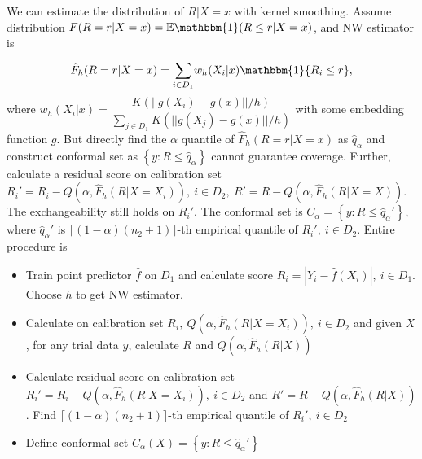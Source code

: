 \documentclass[12pt, a4paper, oneside]{article}
\begin{document}
    
    We can estimate the distribution of $R|X=x$ with kernel smoothing. Assume distribution $F(R=r|X=x)=\mathbb{E}\mathbbm{1}(R\leq r|X=x)$, and NW estimator is
    \begin{equation*}
        \hat{F}_h(R=r|X=x)=\overset{}{\underset{i\in D_1}\sum}w_h(X_i|x)\mathbbm{1}\{R_i\leq r\},
    \end{equation*}
    where $w_h(X_i|x)=\dfrac{K(||g(X_i)-g(x)||/h)}{\overset{}{\underset{j\in D_1}\sum}K(||g(X_j)-g(x)||/h)}$ with some embedding function $g$. But directly find the $\alpha$ quantile of $\hat{F}_h(R=r|X=x)$ as $\hat{q}_\alpha$ and construct conformal set as $\left\{ y:R\leq \hat{q}_\alpha \right\}$ cannot guarantee coverage. Further, calculate a residual score on calibration set $R_i'=R_i-Q(\alpha,\hat{F}_h(R|X=X_i)),\ i\in D_2,\ R'=R-Q(\alpha,\hat{F}_h(R|X=X))$. The exchangeability still holds on $R_i'$. The conformal set is $C_\alpha=\left\{ y:R\leq\hat{q}_\alpha' \right\}$, where $\hat{q}_\alpha'$ is $\lceil(1-\alpha)(n_2+1)\rceil$-th empirical quantile of $R_i',\ i\in D_2$. Entire procedure is
    \begin{itemize}
        \item Train point predictor $\hat{f}$ on $D_1$ and calculate score $R_i=|Y_i-\hat{f}(X_i)|,\ i\in D_1$. Choose $h$ to get NW estimator.
        \item Calculate on calibration set $R_i,\ Q(\alpha,\hat{F}_h(R|X=X_i)),\ i\in D_2$ and given $X$, for any trial data $y$, calculate $R$ and $Q(\alpha,\hat{F}_h(R|X))$
        \item Calculate residual score on calibration set $R_i'=R_i-Q(\alpha,\hat{F}_h(R|X=X_i)),\ i\in D_2$ and $R'=R-Q(\alpha,\hat{F}_h(R|X))$. Find $\lceil(1-\alpha)(n_2+1)\rceil$-th empirical quantile of $R_i',\ i\in D_2$
        \item Define conformal set $C_\alpha(X)=\left\{ y:R\leq\hat{q}_\alpha' \right\}$
    \end{itemize}
\newpage


\end{document}
